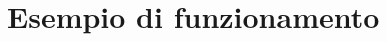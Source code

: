 \documentclass[a4paper,oneside,openright,titlepage,10pt,footinclude,headinclude]{scrbook}
\begin{document}
\chapter{Esempio di funzionamento}\label{esempio}


\begin{thebibliography}{9}

\end{thebibliography}
\end{document}
